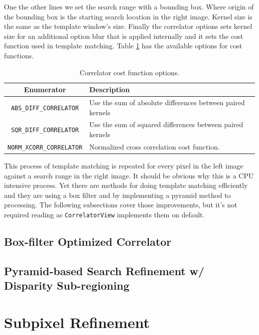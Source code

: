 One the other lines we set the search range with a bounding box. Where
origin of the bounding box is the starting search location in the
right image. Kernel size is the same as the template window's
size. Finally the correlator options sets kernel size for an
additional option blur that is applied internally and it sets the cost
function used in template matching. Table
\ref{tbl:correlator-cost-functions} has the available options for cost
functions.

\begin{table}[htb]\begin{centering}
\begin{tabular}{|c|p{4 in}|} \hline
Enumerator & Description \\ \hline \hline
\verb#ABS_DIFF_CORRELATOR# & Use the sum of absolute differences between paired kernels \\ \hline
\verb#SQR_DIFF_CORRELATOR# & Use the sum of squared differences between paired kernels \\ \hline
\verb#NORM_XCORR_CORRELATOR# & Normalized cross correlation cost function. \\ \hline
\end{tabular}
\caption{Correlator cost function options.}
\label{tbl:correlator-cost-functions}
\end{centering}\end{table}

This process of template matching is repeated for every pixel in the
left image against a search range in the right image. It should be
obvious why this is a CPU intensive process. Yet there are methods for
doing template matching efficiently and they are using a box filter
and by implementing a pyramid method to processing. The following
subsections cover those improvements, but it's not required reading as
{\tt CorrelatorView} implements them on default.

\subsection{Box-filter Optimized Correlator}

\subsection{Pyramid-based Search Refinement w/ Disparity Sub-regioning}

\section{Subpixel Refinement}
\label{sec:subpixel_refinement}


